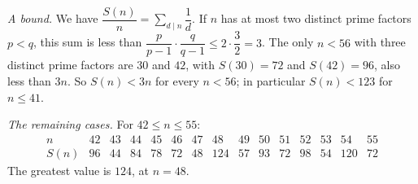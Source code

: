 \emph{A bound.} We have $\dfrac{S(n)}{n}=\sum_{d\mid n}\dfrac{1}{d}$. If $n$ has at most two distinct prime factors $p<q$, this sum is less than $\dfrac{p}{p-1}\cdot\dfrac{q}{q-1}\le2\cdot\dfrac{3}{2}=3$. The only $n<56$ with three distinct prime factors are $30$ and $42$, with $S(30)=72$ and $S(42)=96$, also less than $3n$. So $S(n)<3n$ for every $n<56$; in particular $S(n)<123$ for $n\le41$.

\emph{The remaining cases.} For $42\le n\le55$:
\[\begin{array}{c|cccccccccccccc}
n&42&43&44&45&46&47&48&49&50&51&52&53&54&55\\\hline
S(n)&96&44&84&78&72&48&124&57&93&72&98&54&120&72
\end{array}\]
The greatest value is $\boxed{124}$, at $n=48$.
